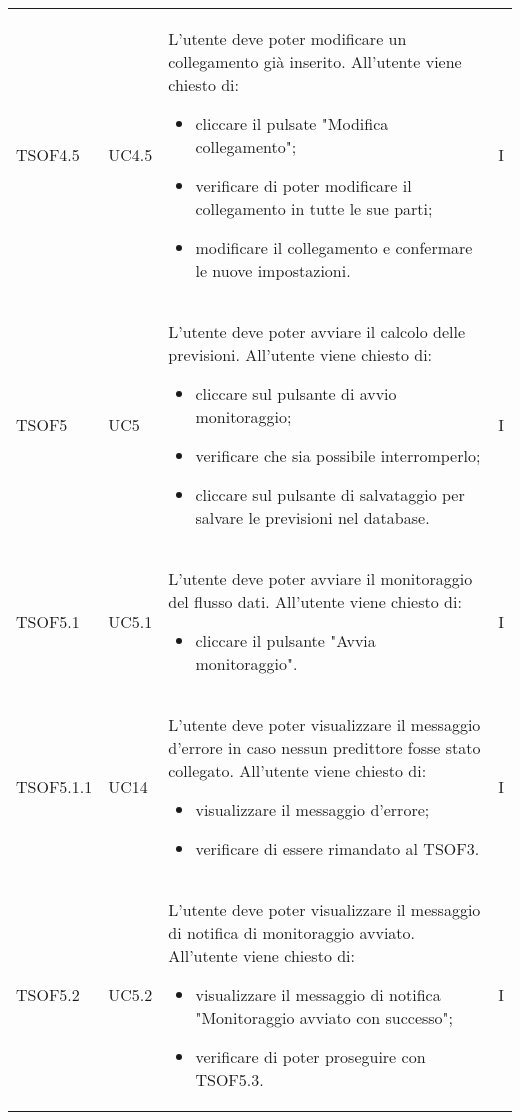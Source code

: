 \begin{longtable}{C{2.5cm} C{2.5cm} L{8cm} C{2cm}}
TSOF4.5 &
UC4.5 &
L'utente deve poter modificare un collegamento già inserito. All'utente viene chiesto di:
\begin{itemize}
	\item cliccare il pulsate "Modifica collegamento";
	\item verificare di poter modificare il collegamento in tutte le sue parti;
	\item modificare il collegamento e confermare le nuove impostazioni.
\end{itemize}&
I \\




TSOF5 &
UC5 &
L'utente deve poter avviare il calcolo delle previsioni. All'utente viene chiesto di:
\begin{itemize}
	\item cliccare sul pulsante di avvio monitoraggio;
	\item verificare che sia possibile interromperlo;
	\item cliccare sul pulsante di salvataggio per salvare le previsioni nel database.
\end{itemize}&
I \\

TSOF5.1 &
UC5.1 &
L'utente deve poter avviare il monitoraggio del flusso dati. All'utente viene chiesto di:
\begin{itemize}
	\item cliccare il pulsante "Avvia monitoraggio".
\end{itemize}&
I \\

TSOF5.1.1 &
UC14 &
L'utente deve poter visualizzare il messaggio d'errore in caso nessun predittore fosse stato collegato. All'utente viene chiesto di:
\begin{itemize}
	\item visualizzare il messaggio d'errore;
	\item verificare di essere rimandato al TSOF3.
\end{itemize}&
I \\

TSOF5.2 &
UC5.2 &
L'utente deve poter visualizzare il messaggio di notifica di monitoraggio avviato. All'utente viene chiesto di:
\begin{itemize}
	\item visualizzare il messaggio di notifica "Monitoraggio avviato con successo";
	\item verificare di poter proseguire con TSOF5.3.
\end{itemize}&
I \\


\end{longtable}
